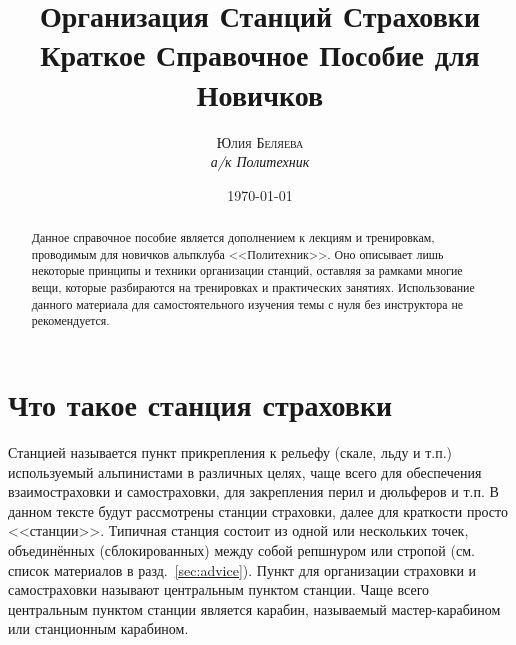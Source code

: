 \documentclass[fleqn, 12pt]{extarticle}
\begin{document}

\title{\textbf{Организация Станций Страховки}\\
\large{Краткое Справочное Пособие для Новичков}}
\author{\textsc{Юлия Беляева}\\\textit{а/к Политехник}}
\date{\today}

\maketitle

\begin{abstract}
	Данное справочное пособие является дополнением к лекциям и тренировкам, проводимым для новичков альпклуба <<Политехник>>. Оно описывает лишь некоторые принципы и техники организации станций,
	оставляя за рамками многие вещи, которые разбираются на тренировках и практических занятиях. Использование данного материала для самостоятельного изучения темы с нуля без инструктора не
	рекомендуется.
\end{abstract}

\section{Что такое станция страховки}
Станцией называется пункт прикрепления к рельефу (скале, льду и т.п.) используемый альпинистами в различных целях, чаще всего для обеспечения взаимостраховки и самостраховки, для
закрепления перил и дюльферов и т.п. В данном тексте будут рассмотрены станции страховки, далее для краткости просто <<станции>>. Типичная станция состоит из одной или нескольких точек,
объединённых (сблокированных) между собой репшнуром или стропой (см. список материалов в разд.~\ref{sec:advice}). Пункт для организации страховки и самостраховки называют центральным пунктом
станции. Чаще всего центральным пунктом станции является карабин, называемый мастер-карабином или станционным карабином.
\end{document}
